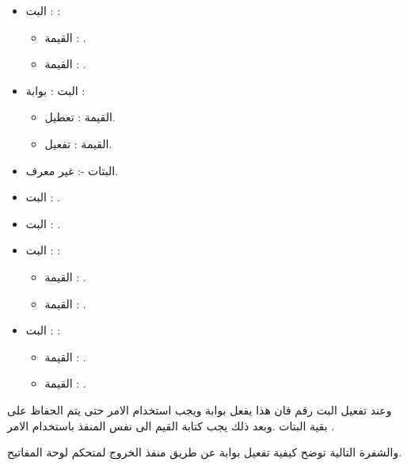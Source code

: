 \documentclass[document.tex]{subfiles}
\begin{document}
\begin{itemize}
\item البت : :
\begin{itemize}
\item القيمة : .
\item القيمة : .
\end{itemize}

\item البت : بوابة :
\begin{itemize}
\item القيمة : تعطيل.
\item القيمة : تفعيل.
\end{itemize}

\item البتات -: غير معرف.
\item البت : .
\item البت : .
\item البت : :
\begin{itemize}
\item القيمة : .
\item القيمة : .
\end{itemize}

\item البت : :
\begin{itemize}
\item القيمة : .
\item القيمة : .
\end{itemize}
\end{itemize}

وعند تفعيل البت رقم  فان هذا يفعل بوابة  ويجب استخدام الامر  حتى يتم الحفاظ على بقية البتات .وبعد ذلك يجب كتابة القيم الى نفس المنفذ باستخدام الامر  .

والشفرة التالية توضح كيفية تفعيل بوابة  عن طريق منفذ الخروج  لمتحكم لوحة المفاتيح.

\begin{english}
\lstset{numberstyle=\tiny,numbers=left,stepnumber=1,numbersep=5pt,tabsize=2,extendedchars=true,breaklines=true,frame=b,showspaces=false, showtabs=false,xleftmargin=10pt,framexleftmargin=10pt,framexrightmargin=5pt,framexbottommargin=4pt,showstringspaces=false,language=[x86masm]Assembler}


\end{english}
\end{document}
